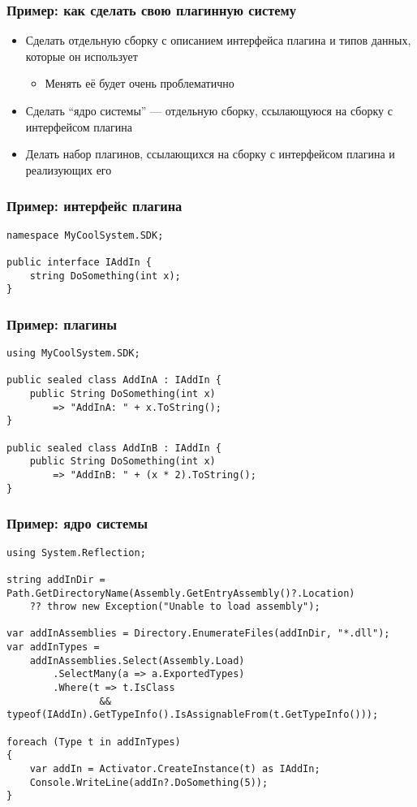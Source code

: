 \documentclass{../../slides-style}
\begin{document}
    \begin{frame}
        \frametitle{Пример: как сделать свою плагинную систему}
        \begin{itemize}
            \item Сделать отдельную сборку с описанием интерфейса плагина и типов данных, которые он использует
            \begin{itemize}
                \item Менять её будет очень проблематично
            \end{itemize}
            \item Сделать \enquote{ядро системы} --- отдельную сборку, ссылающуюся на сборку с интерфейсом плагина
            \item Делать набор плагинов, ссылающихся на сборку с интерфейсом плагина и реализующих его
        \end{itemize}
    \end{frame}

    \begin{frame}[fragile]
        \frametitle{Пример: интерфейс плагина}
        \begin{verbatim}
namespace MyCoolSystem.SDK;

public interface IAddIn {
    string DoSomething(int x);
}
        \end{verbatim}
    \end{frame}

    \begin{frame}[fragile]
        \frametitle{Пример: плагины}
        \begin{verbatim}
using MyCoolSystem.SDK;

public sealed class AddInA : IAddIn {
    public String DoSomething(int x)
        => "AddInA: " + x.ToString();
}

public sealed class AddInB : IAddIn {
    public String DoSomething(int x)
        => "AddInB: " + (x * 2).ToString();
}
        \end{verbatim}
    \end{frame}

    \begin{frame}[fragile]
        \frametitle{Пример: ядро системы}
        \begin{scriptsize}
            \begin{verbatim}
using System.Reflection;

string addInDir = Path.GetDirectoryName(Assembly.GetEntryAssembly()?.Location) 
    ?? throw new Exception("Unable to load assembly");

var addInAssemblies = Directory.EnumerateFiles(addInDir, "*.dll");
var addInTypes =
    addInAssemblies.Select(Assembly.Load)
        .SelectMany(a => a.ExportedTypes)
        .Where(t => t.IsClass
                && typeof(IAddIn).GetTypeInfo().IsAssignableFrom(t.GetTypeInfo()));

foreach (Type t in addInTypes)
{
    var addIn = Activator.CreateInstance(t) as IAddIn;
    Console.WriteLine(addIn?.DoSomething(5));
}
            \end{verbatim}
        \end{scriptsize}
    \end{frame}
\end{document}
